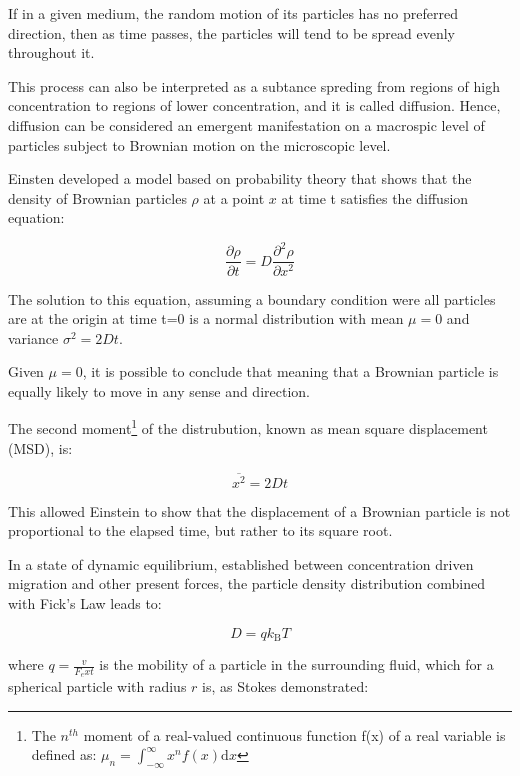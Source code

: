 If in a given medium, the random motion of its particles has no preferred direction, then as time passes, the particles will tend to be spread evenly throughout it.

This process can also be interpreted as a subtance spreding from regions of high concentration to regions of lower concentration, and it is called diffusion. Hence, diffusion can be considered an emergent manifestation on a macrospic level of particles subject to Brownian motion on the microscopic level.

Einsten developed a model based on probability theory that shows that the density of Brownian particles $\rho$ at a point $x$ at time t satisfies the diffusion equation:

\begin{equation}
\frac{\partial \rho}{\partial t}=D \frac{\partial^{2} \rho}{\partial x^{2}}
\end{equation}

The solution to this equation, assuming a boundary condition were all particles are at the origin at time t=0 is a normal distribution with mean $\mu=0$ and variance $\sigma^{2}=2 D t$.

Given $\mu=0$, it is possible to conclude that  meaning that a Brownian particle is equally likely to move in any sense and direction.

The second moment\footnote{The $n^{th}$ moment of a real-valued continuous function f(x) of a real variable is defined as:  $\mu_{n}=\int_{-\infty}^{\infty} x^{n} f(x) \mathrm{d} x$} of the distrubution, known as mean square displacement (MSD), is:

\begin{equation}
\overline{x^{2}}=2 D t
\end{equation}

This allowed Einstein to show that the displacement of a Brownian particle is not proportional to the elapsed time, but rather to its square root. 

In a state of dynamic equilibrium, established between concentration driven migration and other present forces, the particle density distribution combined with Fick's Law leads to:

\begin{equation}
D=q k_{\mathrm{B}} T
\end{equation}

where $q = \frac{v}{F_ext}$ is the mobility of a particle in the surrounding fluid, which for a spherical particle with radius $r$ is, as Stokes demonstrated: 

